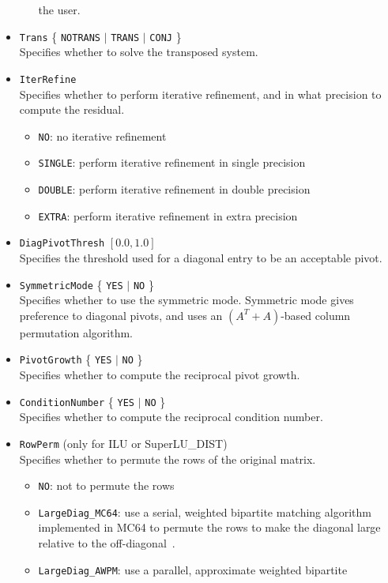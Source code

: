 \begin{itemize}
\begin{itemize}
	                the user.
    \end{itemize}
\item {\tt Trans}  \{ {\tt NOTRANS} $|$ {\tt TRANS} $|$ {\tt CONJ} \} \\
    Specifies whether to solve the transposed system.
\item {\tt IterRefine} \\
    Specifies whether to perform iterative refinement, and in what
    precision to compute the residual.
    \begin{itemize}
    \item {\tt NO}: no iterative refinement
    \item {\tt SINGLE}: perform iterative refinement in single precision
    \item {\tt DOUBLE}: perform iterative refinement in double precision
    \item {\tt EXTRA}: perform iterative refinement in extra precision
    \end{itemize}
\item {\tt DiagPivotThresh}  $[0.0, 1.0]$ \\
    Specifies the threshold used for a diagonal entry to be an
    acceptable pivot.
\item {\tt SymmetricMode}  \{ {\tt YES} $|$ {\tt NO} \} \\
    Specifies whether to use the symmetric mode. Symmetric mode gives 
    preference to diagonal pivots, and uses an $(A^T + A)$-based column
    permutation algorithm.
\item {\tt PivotGrowth} \{ {\tt YES} $|$ {\tt NO} \} \\
    Specifies whether to compute the reciprocal pivot growth.
\item {\tt ConditionNumber} \{ {\tt YES} $|$ {\tt NO} \} \\
    Specifies whether to compute the reciprocal condition number.
\item {\tt RowPerm} (only for ILU or SuperLU\_DIST) \\
    Specifies whether to permute the rows of the original matrix.
    \begin{itemize}
    \item {\tt NO}: not to permute the rows
    \item {\tt LargeDiag\_MC64}: use a serial, weighted bipartite matching
      algorithm implemented in MC64 to permute the rows to make the
      diagonal large relative to the off-diagonal~\cite{duffkoster01}.
    \item {\tt LargeDiag\_AWPM}: use a parallel, approximate weighted bipartite

\end{itemize}
\end{itemize}
